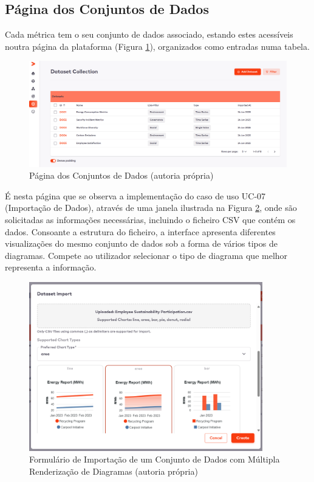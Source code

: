 \subsection{Página dos Conjuntos de Dados}

Cada métrica tem o seu conjunto de dados associado, estando estes acessíveis noutra página da plataforma (Figura \ref{fig:dataset_done}), organizados como entradas numa tabela.

\begin{figure}[H]
    \centering
    \includegraphics[width=\linewidth,keepaspectratio]{frontmatter/assets/platform_prints/dataset/dataset_done.png}
    \caption{Página dos Conjuntos de Dados (autoria própria)}
    \label{fig:dataset_done}
\end{figure}

É nesta página que se observa a implementação do caso de uso UC-07 (Importação de Dados), através de uma janela ilustrada na Figura \ref{fig:create_dataset}, onde são solicitadas as informações necessárias, incluindo o ficheiro CSV que contém os dados. Consoante a estrutura do ficheiro, a interface apresenta diferentes visualizações do mesmo conjunto de dados sob a forma de vários tipos de diagramas. Compete ao utilizador selecionar o tipo de diagrama que melhor representa a informação.

\begin{figure}[H]
    \centering
    \includegraphics[width=4in,keepaspectratio]{frontmatter/assets/platform_prints/dataset/dataset_import.png}
    \caption{Formulário de Importação de um Conjunto de Dados com Múltipla Renderização de Diagramas (autoria própria)}
    \label{fig:create_dataset}
\end{figure}

